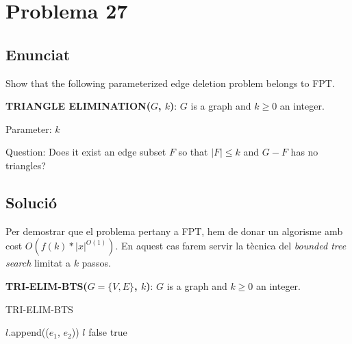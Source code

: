 \section{Problema 27}
\subsection{Enunciat}
Show that the following parameterized edge deletion problem belongs to FPT.
\par
\textbf{TRIANGLE ELIMINATION($G$, $k$)}: $G$ is a graph and $k\geq0$ an integer.
\par
Parameter: $k$
\par
Question: Does it exist an edge subset $F$ so that $|F| \leq k$ and $G-F$ has no triangles?

\subsection{Solució}
Per demostrar que el problema pertany a FPT, hem de donar un algorisme amb cost $O(f(k)*|x|^{O(1)})$.
En aquest cas farem servir la tècnica del \textit{bounded tree search} limitat a $k$ passos.
\par
\textbf{TRI-ELIM-BTS($G=\{V,E\}$, $k$)}: $G$ is a graph and $k\geq0$ an integer.


\begin{algorithm}
\caption{TRI-ELIM-BTS}\label{euclid}
\begin{algorithmic}[1]
 
            \State $l$.append(($e_1$, $e_2$))
        \EndIf
    \EndFor
\EndFor
\State \Return $l$
\EndFunction
\newline
{}
    \State \Return false
\EndIf
{} 
 
    \EndIf
    \EndFor
    \State \Return true
    \EndIf
\EndFor
\State {} 
\EndFunction
\end{algorithmic}
\end{algorithm}

